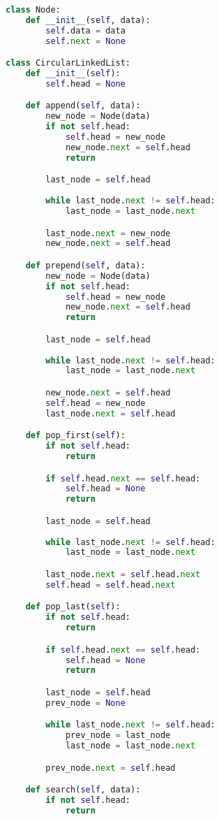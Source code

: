 \begin{lstlisting}[language=Python]
class Node:
    def __init__(self, data):
        self.data = data
        self.next = None

class CircularLinkedList:
    def __init__(self):
        self.head = None

    def append(self, data):
        new_node = Node(data)
        if not self.head:
            self.head = new_node
            new_node.next = self.head
            return

        last_node = self.head
        
        while last_node.next != self.head:
            last_node = last_node.next

        last_node.next = new_node
        new_node.next = self.head

    def prepend(self, data):
        new_node = Node(data)
        if not self.head:
            self.head = new_node
            new_node.next = self.head
            return

        last_node = self.head
        
        while last_node.next != self.head:
            last_node = last_node.next

        new_node.next = self.head
        self.head = new_node
        last_node.next = self.head

    def pop_first(self):
        if not self.head:
            return

        if self.head.next == self.head:
            self.head = None
            return

        last_node = self.head
        
        while last_node.next != self.head:
            last_node = last_node.next

        last_node.next = self.head.next
        self.head = self.head.next

    def pop_last(self):
        if not self.head:
            return

        if self.head.next == self.head:
            self.head = None
            return

        last_node = self.head
        prev_node = None

        while last_node.next != self.head:
            prev_node = last_node
            last_node = last_node.next

        prev_node.next = self.head

    def search(self, data):
        if not self.head:
            return


\end{lstlisting}
